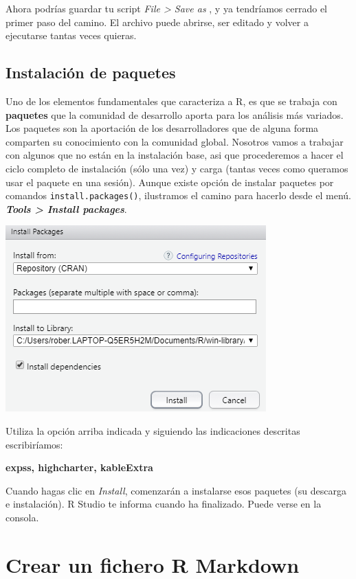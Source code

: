 \documentclass[
]{book}
\begin{document}
Ahora podrías guardar tu script \emph{File \textgreater{} Save as} , y ya tendríamos cerrado el primer paso del camino. El archivo puede abrirse, ser editado y volver a ejecutarse tantas veces quieras.

\hypertarget{instalaciuxf3n-de-paquetes}{%
\subsection{Instalación de paquetes}\label{instalaciuxf3n-de-paquetes}}

Uno de los elementos fundamentales que caracteriza a R, es que se trabaja con \textbf{paquetes} que la comunidad de desarrollo aporta para los análisis más variados. Los paquetes son la aportación de los desarrolladores que de alguna forma comparten su conocimiento con la comunidad global. Nosotros vamos a trabajar con algunos que no están en la instalación base, asi que procederemos a hacer el ciclo completo de instalación (sólo una vez) y carga (tantas veces como queramos usar el paquete en una sesión). Aunque existe opción de instalar paquetes por comandos \texttt{install.packages()}, ilustramos el camino para hacerlo desde el menú. \textbf{\emph{Tools \textgreater{} Install packages}}.

\includegraphics{data/install_packages.png}

Utiliza la opción arriba indicada y siguiendo las indicaciones descritas escribiríamos:

\textbf{expss, highcharter, kableExtra}

Cuando hagas clic en \emph{Install}, comenzarán a instalarse esos paquetes (su descarga e instalación). R Studio te informa cuando ha finalizado. Puede verse en la consola.

\hypertarget{crear-un-fichero-r-markdown}{%
\section{Crear un fichero R Markdown}\label{crear-un-fichero-r-markdown}}
\end{document}
